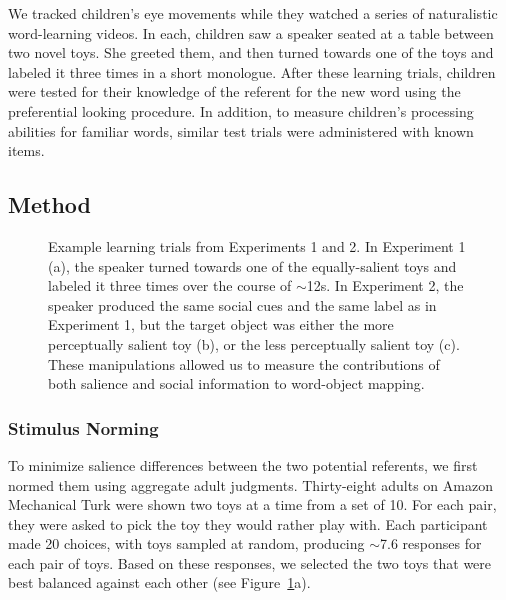 \documentclass[man,floatsintext]{apa6}
\begin{document}
We tracked children's eye movements while they watched a series of naturalistic word-learning videos. In each, children saw a speaker seated at a table between two novel toys. She greeted them, and then turned towards one of the toys and labeled it three times in a short monologue. After these learning trials, children were tested for their knowledge of the referent for the new word using the preferential looking procedure. In addition, to measure children's processing abilities for familiar words, similar test trials were administered with known items.

\subsection{Method}

\begin{figure}[tb]
	\caption{\label{fig:design} Example learning trials from Experiments 1 and 2. In Experiment 1 (a), the speaker turned towards one of the equally-salient toys and labeled it three times over the course of $\sim$12s. In Experiment 2, the speaker produced the same social cues and the same label as in Experiment 1, but the target object was either the more perceptually salient toy (b), or the less perceptually salient toy (c). These manipulations allowed us to measure the contributions of both salience and social information to word-object mapping.}
\end{figure}

\subsubsection{Stimulus Norming}
To minimize salience differences between the two potential referents, we first normed them using aggregate adult judgments. Thirty-eight adults on Amazon Mechanical Turk were shown two toys at a time from a set of 10. For each pair, they were asked to pick the toy they would rather play with. Each participant made 20 choices, with toys sampled at random, producing $\sim$7.6 responses for each pair of toys. Based on these responses, we selected the two toys that were best balanced against each other (see Figure~\ref{fig:design}a).
\end{document}
